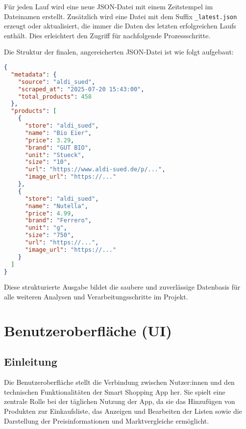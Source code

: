\documentclass[12pt, a4paper]{report} %
\begin{document}
Für jeden Lauf wird eine neue JSON-Datei mit einem Zeitstempel im Dateinamen erstellt. Zusätzlich wird eine Datei mit dem Suffix \texttt{\_latest.json} erzeugt oder aktualisiert, die immer die Daten des letzten erfolgreichen Laufs enthält. Dies erleichtert den Zugriff für nachfolgende Prozessschritte.

Die Struktur der finalen, angereicherten JSON-Datei ist wie folgt aufgebaut:
\begin{lstlisting}[language=JSON, caption={Beispielhafte JSON-Struktur der finalen Ausgabedatei}]
{
  "metadata": {
    "source": "aldi_sued",
    "scraped_at": "2025-07-20 15:43:00",
    "total_products": 458
  },
  "products": [
    {
      "store": "aldi_sued",
      "name": "Bio Eier",
      "price": 3.29,
      "brand": "GUT BIO",
      "unit": "Stueck",
      "size": "10",
      "url": "https://www.aldi-sued.de/p/...",
      "image_url": "https://..."
    },
    {
      "store": "aldi_sued",
      "name": "Nutella",
      "price": 4.99,
      "brand": "Ferrero",
      "unit": "g",
      "size": "750",
      "url": "https://...",
      "image_url": "https://..."
    }
  ]
}
\end{lstlisting}
Diese strukturierte Ausgabe bildet die saubere und zuverlässige Datenbasis für alle weiteren Analysen und Verarbeitungsschritte im Projekt.

\chapter{Benutzeroberfläche (UI)}
\label{chap:ui}

\section{Einleitung}
Die Benutzeroberfläche stellt die Verbindung zwischen Nutzer:innen und den technischen Funktionalitäten der Smart Shopping App her. Sie spielt eine zentrale Rolle bei der täglichen Nutzung der App, da sie das Hinzufügen von Produkten zur Einkaufsliste, das Anzeigen und Bearbeiten der Listen sowie die Darstellung der Preisinformationen und Marktvergleiche ermöglicht.
\end{document}
